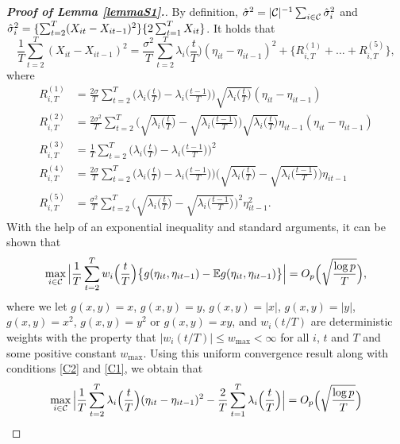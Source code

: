 \documentclass[a4paper,12pt]{article}
\numberwithin{equation}{section}
\begin{document}
\begin{proof}[\textnormal{\textbf{Proof of Lemma \ref{lemmaS1}.}}]
By definition, $\hat{\sigma}^2 = |\mathcal{C}|^{-1} \sum_{i \in \mathcal{C}} \hat{\sigma}_i^2$ and $\hat{\sigma}_i^2 = \{\sum_{t=2}^T (X_{it}-X_{it-1})^2\}\{2 \sum_{t=1}^T X_{it}\}$. It holds that 
\begin{equation}\label{eq:approxerror:claim3:expansion}
\frac{1}{T} \sum\limits_{t=2}^T (X_{it} - X_{it-1})^2 = \frac{\sigma^2}{T} \sum\limits_{t=2}^T \lambda_i\Big(\frac{t}{T}\Big) (\eta_{it} - \eta_{it-1})^2 + \big\{R_{i,T}^{(1)} + \ldots + R_{i,T}^{(5)}\big\},
\end{equation}
where
\begin{align*}
R_{i,T}^{(1)} & = \frac{2\sigma}{T} \sum\limits_{t=2}^T \Big( \lambda_i\Big(\frac{t}{T}\Big) - \lambda_i\Big(\frac{t-1}{T}\Big) \Big) \sqrt{\lambda_i\Big(\frac{t}{T}\Big)} (\eta_{it} - \eta_{it-1}) \\
R_{i,T}^{(2)} & = \frac{2\sigma^2}{T} \sum\limits_{t=2}^T \Big( \sqrt{\lambda_i\Big(\frac{t}{T}\Big)} - \sqrt{\lambda_i\Big(\frac{t-1}{T}\Big)} \Big) \sqrt{\lambda_i\Big(\frac{t}{T}\Big)} \eta_{it-1} (\eta_{it} - \eta_{it-1}) \\
R_{i,T}^{(3)} & = \frac{1}{T} \sum\limits_{t=2}^T \Big( \lambda_i\Big(\frac{t}{T}\Big) - \lambda_i\Big(\frac{t-1}{T}\Big) \Big)^2 \\
R_{i,T}^{(4)} & = \frac{2 \sigma}{T} \sum\limits_{t=2}^T \Big( \lambda_i\Big(\frac{t}{T}\Big) - \lambda_i\Big(\frac{t-1}{T}\Big) \Big) \Big( \sqrt{\lambda_i\Big(\frac{t}{T}\Big)} - \sqrt{\lambda_i\Big(\frac{t-1}{T}\Big)} \Big) \eta_{it-1} \\
R_{i,T}^{(5)} & = \frac{\sigma^2}{T} \sum\limits_{t=2}^T  \Big( \sqrt{\lambda_i\Big(\frac{t}{T}\Big)} - \sqrt{\lambda_i\Big(\frac{t-1}{T}\Big)} \Big)^2 \eta_{it-1}^2.
\end{align*} 
With the help of an exponential inequality and standard arguments, it can be shown that 
\[ \max_{i \in \mathcal{C}} \Big| \frac{1}{T} \sum_{t=2}^T w_i\Big(\frac{t}{T}\Big) \big\{ g(\eta_{it},\eta_{it-1}) - \mathbb{E} g(\eta_{it},\eta_{it-1}) \big\} \Big| = O_p\Big( \sqrt{\frac{\log p}{T}} \Big), \]
where we let $g(x,y) = x$, $g(x,y) = y$, $g(x,y) = |x|$, $g(x,y) = |y|$, $g(x,y) = x^2$, $g(x,y) = y^2$ or $g(x,y) = xy$, and $w_i(t/T)$ are deterministic weights with the property that $|w_i(t/T)| \le w_{\max} < \infty$ for all $i$, $t$ and $T$ and some positive constant $w_{\max}$. Using this uniform convergence result along with conditions \ref{C2} and \ref{C1}, we obtain that 
\[ \max_{i \in \mathcal{C}} \Big| \frac{1}{T} \sum\limits_{t=2}^T \lambda_i\Big(\frac{t}{T}\Big) (\eta_{it} - \eta_{it-1})^2 - \frac{2}{T} \sum\limits_{t=1}^T \lambda_i\Big(\frac{t}{T}\Big) \Big| = O_p\Big( \sqrt{\frac{\log p}{T}} \Big) \]

\end{proof}
\end{document}
